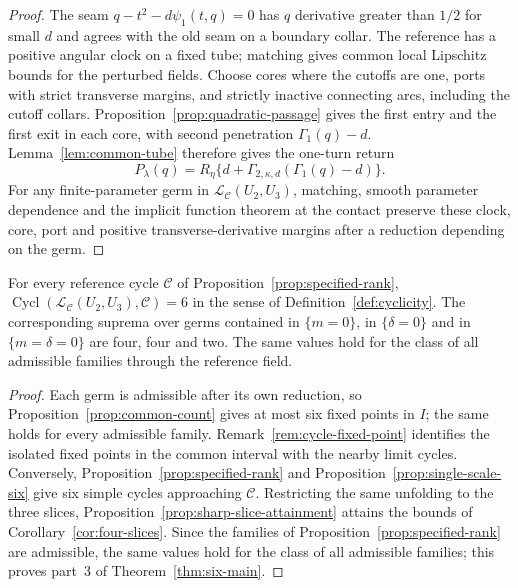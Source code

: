 \begin{proof}
The seam $q-t^2-d\psi_1(t,q)=0$ has $q$ derivative greater than $1/2$
for small $d$ and agrees with the old seam on a boundary collar. The
reference has a positive angular clock on a fixed tube; matching gives
common local Lipschitz bounds for the perturbed fields.
Choose cores where the cutoffs are one, ports with strict transverse margins,
and strictly inactive connecting arcs, including the cutoff collars.
Proposition~\ref{prop:quadratic-passage} gives the first entry and the
first exit in each core, with second penetration $\Gamma_1(q)-d$.
Lemma~\ref{lem:common-tube} therefore gives the one-turn return
\[
 P_\lambda(q)=R_\eta\{d+
       \Gamma_{2,\kappa,d}(\Gamma_1(q)-d)\}.
\]
For any finite-parameter germ in \(\mathcal L_{\mathcal C}(U_2,U_3)\),
matching, smooth parameter dependence and the implicit function theorem at
the contact preserve these clock, core, port and positive transverse-derivative
margins after a reduction depending on the germ.
\end{proof}

\begin{corollary}
\label{cor:specified-cyclicity}
For every reference cycle \(\mathcal C\) of
Proposition~\ref{prop:specified-rank},
\(\operatorname{Cycl}(\mathcal L_{\mathcal C}(U_2,U_3),\mathcal C)=6\) in
the sense of Definition~\ref{def:cyclicity}. The corresponding suprema over
germs contained in \(\{m=0\}\), in \(\{\delta=0\}\) and in
\(\{m=\delta=0\}\) are four, four and two. The same values hold for the class
of all admissible families through the reference field.
\end{corollary}

\begin{proof}
Each germ is admissible after its own reduction, so
Proposition~\ref{prop:common-count} gives at most six fixed points in \(I\);
the same holds for every admissible family.
Remark~\ref{rem:cycle-fixed-point} identifies the isolated fixed points
in the common interval with the nearby limit cycles. Conversely,
Proposition~\ref{prop:specified-rank} and
Proposition~\ref{prop:single-scale-six} give six simple cycles
approaching \(\mathcal C\).
Restricting the same unfolding to the three slices,
Proposition~\ref{prop:sharp-slice-attainment} attains the bounds of
Corollary~\ref{cor:four-slices}. Since the families of
Proposition~\ref{prop:specified-rank} are admissible, the same values hold for
the class of all admissible families; this proves part~3 of
Theorem~\ref{thm:six-main}.
\end{proof}

